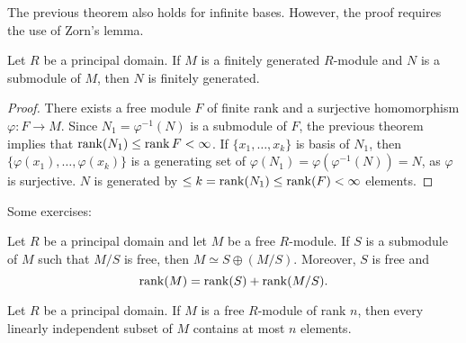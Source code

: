 The previous theorem also holds for infinite bases. However, 
the proof requires the use of Zorn's lemma. 
	



\begin{corollary}
Let $R$ be a principal domain. If $M$ is a finitely generated $R$-module and $N$ 
is a submodule of $M$, then $N$ is finitely generated.   
\end{corollary}

\begin{proof}
There exists a free module $F$ of finite rank and a surjective homomorphism
$\varphi\colon F\to M$. Since $N_1=\varphi^{-1}(N)$ is a submodule of $F$, 
the previous theorem implies that  
$\operatorname{rank}(N_1)\leq\operatorname{rank} F<\infty$. If $\{x_1,\dots,x_k\}$ is basis of $N_1$, then
$\{\varphi(x_1),\dots,\varphi(x_k)\}$ is a generating set of 
$\varphi(N_1)=\varphi(\varphi^{-1}(N))=N$, as 
$\varphi$ is surjective. $N$ is generated by 
$\leq k=\operatorname{rank}(N_1)\leq\operatorname{rank}(F)<\infty$ elements.  
\end{proof}

Some exercises:

\begin{exercise}
\label{xca:rank}
    Let $R$ be a principal domain and 
    let $M$ be a free $R$-module. If $S$ is a submodule of $M$ such that
    $M/S$ is free, then $M\simeq S\oplus (M/S)$. Moreover,  
	$S$ is free and 
	\[
	\operatorname{rank}(M)=\operatorname{rank}(S)+\operatorname{rank}(M/S).
	\] 
\end{exercise}

\begin{exercise}
\label{xca:n_elements}
    Let $R$ be a principal domain. 
    If $M$ is a free $R$-module of rank $n$, then
    every linearly independent subset of $M$ 
    contains at most $n$ elements. 
\end{exercise}

